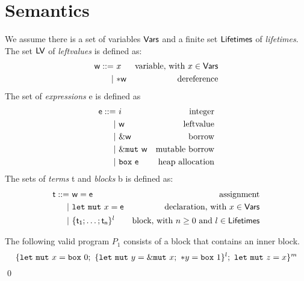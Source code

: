 \section{Semantics}\label{sec:semantics}

\begin{definition}
  We assume there is a set of variables $\mathsf{Vars}$
  and a finite set $\mathsf{Lifetimes}$ of \emph{lifetimes}.
  The set $\mathsf{LV}$ of \emph{leftvalues} is defined as:
  \begin{align*}
    \mathsf{w} ::= &\ x & \text{variable, with $x\in\mathsf{Vars}$}\\
    | &\ \mathtt{*}\mathsf{w} & \text{dereference}
  \end{align*}
  The set of \emph{expressions} \textsf{e} is defined as
  \begin{align*}
    \mathsf{e} ::= &\ i & \text{integer}\\
    | &\ \mathsf{w} & \text{leftvalue}\\
    | &\ \&\mathsf{w} & \text{borrow}\\
    | &\ \&\mathtt{mut}\ \mathsf{w} & \text{mutable borrow}\\
    | &\ \mathtt{box}\ \mathsf{e} & \text{heap allocation}
  \end{align*}
  The sets of \emph{terms} \textsf{t} and \emph{blocks} \textsf{b}
  is defined as:
  \begin{align*}
    \mathsf{t} ::= &\ \mathsf{w}=\mathsf{e} & \text{assignment}\\
    | &\ \mathtt{let\ mut}\ x=\mathsf{e} & \text{declaration, with $x\in\mathsf{Vars}$}\\
    | &\ \{\mathsf{t_1};\ldots;\mathsf{t_n}\}^l & \text{block, with $n\ge 0$ and $l\in\mathsf{Lifetimes}$}
  \end{align*}
\end{definition}

\begin{example}\label{ex:program}
  The following valid program $P_1$ consists of a block that contains an inner block.
  \[
    \{
      \mathtt{let\ mut}\ x = \mathtt{box}\ 0;\
      \{\mathtt{let\ mut}\ y = \&\mathtt{mut}\  x;\
      \mathtt{*}y = \mathtt{box}\ 1\}^l;\
      \mathtt{let\ mut}\ z = x
    \}^m
  \]
  \qed
\end{example}

